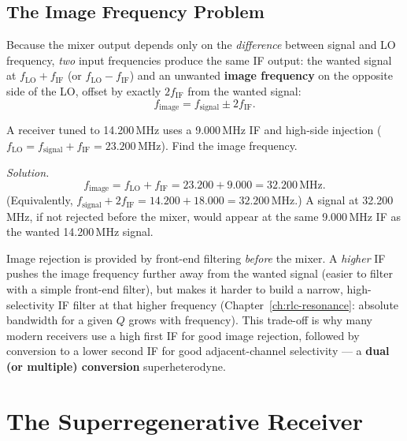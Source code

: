 \subsection{The Image Frequency Problem}

Because the mixer output depends only on the \emph{difference} between
signal and LO frequency, \emph{two} input frequencies produce the same
IF output: the wanted signal at $f_{\text{LO}} + f_{\text{IF}}$ (or
$f_{\text{LO}} - f_{\text{IF}}$) and an unwanted \textbf{image
frequency} on the opposite side of the LO, offset by exactly
$2f_{\text{IF}}$ from the wanted signal:
\[
f_{\text{image}} = f_{\text{signal}} \pm 2f_{\text{IF}}.
\]

\begin{examplebox}
A receiver tuned to 14.200\,MHz uses a 9.000\,MHz IF and high-side
injection ($f_{\text{LO}} = f_{\text{signal}} + f_{\text{IF}} =
23.200\,\text{MHz}$). Find the image frequency.

\emph{Solution.}
\[
f_{\text{image}} = f_{\text{LO}} + f_{\text{IF}} = 23.200 + 9.000 = 32.200\,\text{MHz}.
\]
(Equivalently, $f_{\text{signal}} + 2f_{\text{IF}} = 14.200 + 18.000 =
32.200\,\text{MHz}$.) A signal at 32.200\,MHz, if not rejected before the
mixer, would appear at the same 9.000\,MHz IF as the wanted 14.200\,MHz
signal.
\end{examplebox}

\begin{keyidea}
Image rejection is provided by front-end filtering \emph{before} the
mixer. A \emph{higher} IF pushes the image frequency further away from
the wanted signal (easier to filter with a simple front-end filter), but
makes it harder to build a narrow, high-selectivity IF filter at that
higher frequency (Chapter~\ref{ch:rlc-resonance}: absolute bandwidth for
a given $Q$ grows with frequency). This trade-off is why many
modern receivers use a high first IF for good image rejection, followed
by conversion to a lower second IF for good adjacent-channel
selectivity --- a \textbf{dual (or multiple) conversion} superheterodyne.
\end{keyidea}

\section{The Superregenerative Receiver}


